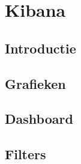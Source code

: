 
\chapter{Kibana}
\label{ch:kibana}


\section{Introductie}
\section{Grafieken}
\section{Dashboard}
\section{Filters}
